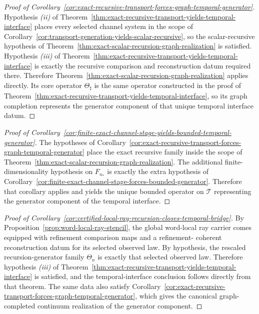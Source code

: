 \begin{proof}[Proof of Corollary~\ref{cor:exact-recursive-transport-forces-graph-temporal-generator}]
\label{proof:cor:exact-recursive-transport-forces-graph-temporal-generator}
Hypothesis \emph{(ii)} of
Theorem~\ref{thm:exact-recursive-transport-yields-temporal-interface} places
every selected channel system in the scope of
Corollary~\ref{cor:transport-generation-yields-scalar-recursive}, so the
scalar-recursive hypothesis of
Theorem~\ref{thm:exact-scalar-recursion-graph-realization} is satisfied.
Hypothesis \emph{(iii)} of
Theorem~\ref{thm:exact-recursive-transport-yields-temporal-interface} is
exactly the recursive comparison and reconstruction datum required there.
Therefore
Theorem~\ref{thm:exact-scalar-recursion-graph-realization} applies directly.
Its core operator \(\Theta_\sharp\) is the same operator constructed in the
proof of
Theorem~\ref{thm:exact-recursive-transport-yields-temporal-interface}, so its
graph completion represents the generator component of that unique temporal
interface datum.
\end{proof}

\begin{proof}[Proof of Corollary~\ref{cor:finite-exact-channel-stage-yields-bounded-temporal-generator}]
\label{proof:cor:finite-exact-channel-stage-yields-bounded-temporal-generator}
The hypotheses of
Corollary~\ref{cor:exact-recursive-transport-forces-graph-temporal-generator}
place the exact recursive family inside the scope of
Theorem~\ref{thm:exact-scalar-recursion-graph-realization}. The additional
finite-dimensionality hypothesis on \(F_{n_\ast}\) is exactly the extra
hypothesis of
Corollary~\ref{cor:finite-exact-channel-stage-forces-bounded-generator}.
Therefore that corollary applies and yields the unique bounded operator on
\(\mathcal T\) representing the generator component of the temporal interface.
\end{proof}

\begin{proof}[Proof of Corollary~\ref{cor:certified-local-ray-recursion-closes-temporal-bridge}]
\label{proof:cor:certified-local-ray-recursion-closes-temporal-bridge}
By Proposition~\ref{prop:word-local-ray-stencil}, the global word-local ray
carrier comes equipped with refinement comparison maps and a refinement-
coherent reconstruction datum for its selected observed law. By hypothesis,
the rescaled recursion-generator family \(\Theta_n\) is exactly that selected
observed law. Therefore hypothesis \emph{(iii)} of
Theorem~\ref{thm:exact-recursive-transport-yields-temporal-interface} is
satisfied, and the temporal-interface conclusion follows directly from that
theorem. The same data also satisfy
Corollary~\ref{cor:exact-recursive-transport-forces-graph-temporal-generator},
which gives the canonical graph-completed continuum realization of the
generator component.
\end{proof}


